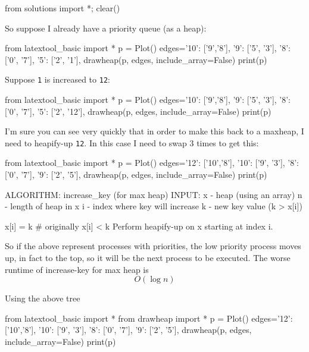 \begin{python0}
from solutions import *; clear()
\end{python0}

So suppose I already have a priority queue (as a heap):

\begin{python}
from latextool_basic import *
p = Plot()
edges={'10': ['9','8'],
       '9': ['5', '3'],
       '8': ['0', '7'],
       '5': ['2', '1'],
     }
drawheap(p, edges, include_array=False)
print(p)
\end{python}


Suppose \texttt{1} is increased to \texttt{12}:

\begin{python}
from latextool_basic import *
p = Plot()
edges={'10': ['9','8'],
       '9': ['5', '3'],
       '8': ['0', '7'],
       '5': ['2', '12'],
     }
drawheap(p, edges, include_array=False)
print(p)
\end{python}


I'm sure you can see very quickly that in order to make this back to
a maxheap, I need to heapify-up \texttt{12}.
In this case I need to swap 3 times to get this:

\begin{python}
from latextool_basic import *
p = Plot()
edges={'12': ['10','8'],
       '10': ['9', '3'],
       '8': ['0', '7'],
       '9': ['2', '5'],
     }
drawheap(p, edges, include_array=False)
print(p)
\end{python}

\begin{console}
ALGORITHM: increase_key (for max heap)
INPUT: x - heap (using an array)
       n - length of heap in x
       i - index where key will increase
       k - new key value (k > x[i])

x[i] = k # originally x[i] < k
Perform heapify-up on x starting at index i.
\end{console}
So if the above represent processes with priorities, the low priority
process moves up, in fact to the top, so it will be the next process to
be executed.
The worse runtime of increase-key for max heap is
\[
O(\log n)
\]

Using the above tree

\begin{python}
from latextool_basic import *
from drawheap import *  
p = Plot()
edges={'12': ['10','8'],
       '10': ['9', '3'],
       '8': ['0', '7'],
       '9': ['2', '5'],
     }
drawheap(p, edges, include_array=False)
print(p)
\end{python}


